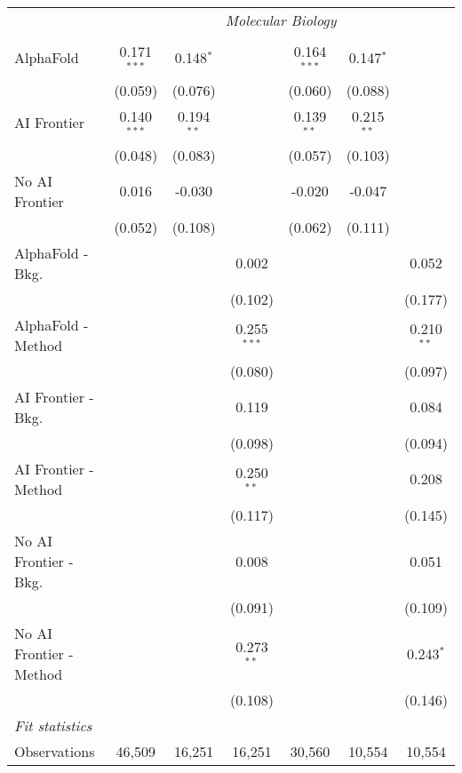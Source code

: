 \begin{tabular}{lcccccc}
 & \multicolumn{6}{c}{\textit{Molecular Biology}} \\ \\
   AlphaFold               & 0.171$^{***}$ & 0.148$^{*}$  &               & 0.164$^{***}$ & 0.147$^{*}$  &   \\   
                           & (0.059)       & (0.076)      &               & (0.060)       & (0.088)      &   \\   
   AI Frontier             & 0.140$^{***}$ & 0.194$^{**}$ &               & 0.139$^{**}$  & 0.215$^{**}$ &   \\   
                           & (0.048)       & (0.083)      &               & (0.057)       & (0.103)      &   \\   
   No AI Frontier          & 0.016         & -0.030       &               & -0.020        & -0.047       &   \\   
                           & (0.052)       & (0.108)      &               & (0.062)       & (0.111)      &   \\   
   AlphaFold - Bkg.        &               &              & 0.002         &               &              & 0.052\\   
                           &               &              & (0.102)       &               &              & (0.177)\\   
   AlphaFold - Method      &               &              & 0.255$^{***}$ &               &              & 0.210$^{**}$\\   
                           &               &              & (0.080)       &               &              & (0.097)\\   
   AI Frontier - Bkg.      &               &              & 0.119         &               &              & 0.084\\   
                           &               &              & (0.098)       &               &              & (0.094)\\   
   AI Frontier - Method    &               &              & 0.250$^{**}$  &               &              & 0.208\\   
                           &               &              & (0.117)       &               &              & (0.145)\\   
   No AI Frontier - Bkg.   &               &              & 0.008         &               &              & 0.051\\   
                           &               &              & (0.091)       &               &              & (0.109)\\   
   No AI Frontier - Method &               &              & 0.273$^{**}$  &               &              & 0.243$^{*}$\\   
                           &               &              & (0.108)       &               &              & (0.146)\\   
   \midrule
   \emph{Fit statistics}\\
   Observations            & 46,509        & 16,251       & 16,251        & 30,560        & 10,554       & 10,554\\  
   

\end{tabular}
